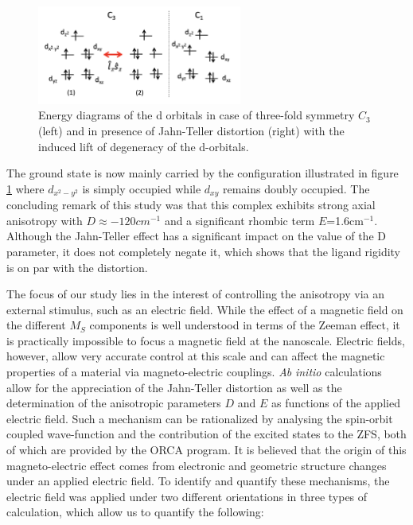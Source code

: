 \documentclass[10pt]{report}
\numberwithin{equation}{section}
\begin{document}
\begin{figure}
    \centering
    \includegraphics[width=0.6\textwidth]{Images/NiMe6tren_config.png}
    \caption{Energy diagrams of the d orbitals in case of three-fold symmetry $C_3$ (left) and in presence of Jahn-Teller distortion (right) with the induced lift of degeneracy of the d-orbitals. }
    \label{NiMe6tren_config}
\end{figure}

The ground state is now mainly carried by the configuration illustrated in figure \ref{NiMe6tren_config} where $d_{x^2-y^2}$ is simply occupied while $d_{xy}$ remains doubly occupied.
The concluding remark of this study was that this complex exhibits strong axial anisotropy with $D\approx-120cm^{-1}$ and a significant rhombic term $E$=1.6cm$^{-1}$. 
Although the Jahn-Teller effect has a significant impact on the value of the D parameter, it does not completely negate it, which shows that the ligand rigidity is on par with the distortion.

\par The focus of our study lies in the interest of controlling the anisotropy via an external stimulus, such as an electric field.
While the effect of a magnetic field on the different $M_S$ components is well understood in terms of the Zeeman effect, it is practically impossible to focus a magnetic field at the nanoscale.
Electric fields, however, allow very accurate control at this scale and can affect the magnetic properties of a material via magneto-electric couplings.
\textit{Ab} \textit{initio} calculations allow for the appreciation of the Jahn-Teller distortion as well as the determination of the anisotropic parameters $D$ and $E$ as functions of the applied electric field.
Such a mechanism can be rationalized by analysing the spin-orbit coupled wave-function and the contribution of the excited states to the ZFS, both of which are provided by the ORCA program.
It is believed that the origin of this magneto-electric effect comes from electronic and geometric structure changes under an applied electric field. 
To identify and quantify these mechanisms, the electric field was applied under two different orientations in three types of calculation, which allow us to quantify the following:
\end{document}
